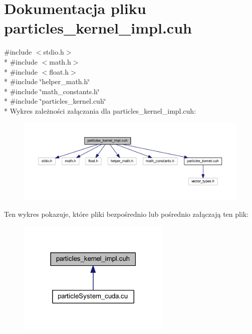 \hypertarget{particles__kernel__impl_8cuh}{\section{Dokumentacja pliku particles\-\_\-kernel\-\_\-impl.\-cuh}
\label{particles__kernel__impl_8cuh}
}
{\ttfamily \#include $<$stdio.\-h$>$}\\*
{\ttfamily \#include $<$math.\-h$>$}\\*
{\ttfamily \#include $<$float.\-h$>$}\\*
{\ttfamily \#include \char`\"{}helper\-\_\-math.\-h\char`\"{}}\\*
{\ttfamily \#include \char`\"{}math\-\_\-constants.\-h\char`\"{}}\\*
{\ttfamily \#include \char`\"{}particles\-\_\-kernel.\-cuh\char`\"{}}\\*
Wykres zależności załączania dla particles\-\_\-kernel\-\_\-impl.\-cuh\-:\nopagebreak
\begin{figure}[H]
\begin{center}
\leavevmode
\includegraphics[width=350pt]{particles__kernel__impl_8cuh__incl}
\end{center}
\end{figure}
Ten wykres pokazuje, które pliki bezpośrednio lub pośrednio załączają ten plik\-:\nopagebreak
\begin{figure}[H]
\begin{center}
\leavevmode
\includegraphics[width=207pt]{particles__kernel__impl_8cuh__dep__incl}
\end{center}
\end{figure}
